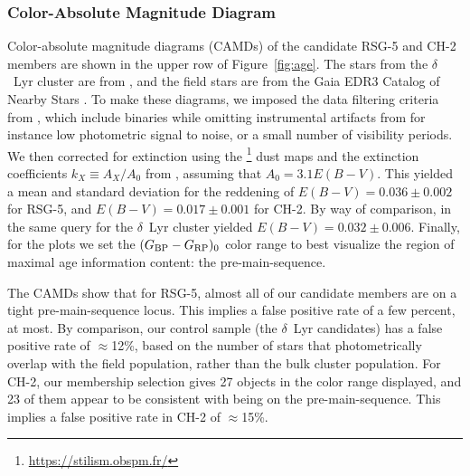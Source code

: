 \documentclass[12pt,twocolumn,linenumbers]{aastex63}
\newcommand{\bpmrpo}{(G_{\rm BP}-G_{\rm RP})_0}
\begin{document}
\subsubsection{Color-Absolute Magnitude Diagram}
\label{sec:camd}

Color-absolute magnitude diagrams (CAMDs) of the candidate RSG-5 and
CH-2 members are shown in the upper row of Figure~\ref{fig:age}.  The
stars from the $\delta$~Lyr cluster are from
\citet{bouma_kep1627_2022}, and the field stars are from the Gaia EDR3
Catalog of Nearby Stars \citep{gaia_gcns_2021}.  To make these
diagrams, we imposed the data filtering criteria from
\citet[][Appendix B]{GaiaCollaboration2018}, which 
include binaries while omitting instrumental artifacts from for
instance low photometric signal to noise, or a small number of
visibility periods.  We then corrected for extinction using the
\citet{lallement_threedimensional_2018}\footnote{\url{https://stilism.obspm.fr/}}
dust maps and the extinction coefficients $k_X\equiv A_X/A_0$ from
\citet{GaiaCollaboration2018}, assuming that $A_0 = 3.1 E(B-V)$.  This
yielded a mean and standard deviation for the reddening of
$E(B-V)=0.036\pm0.002$ for RSG-5, and $E(B-V)=0.017\pm0.001$
for CH-2.  By way of comparison, in \citet{bouma_kep1627_2022} the
same query for the $\delta$~Lyr cluster yielded
$E(B-V)=0.032\pm0.006$.  Finally, for the plots we set the $\bpmrpo$
color range to best visualize the region of maximal age information
content: the pre-main-sequence.

The CAMDs show that for RSG-5, almost all of our candidate members are
on a tight pre-main-sequence locus.  This implies a false positive
rate of a few percent, at most.  By comparison, our control sample
(the $\delta$~Lyr candidates) has a false positive rate of
$\approx$12\%, based on the number of stars that photometrically
overlap with the field population, rather than the bulk cluster
population.  For CH-2, our membership selection gives 27 objects in
the color range displayed, and 23 of them appear to be consistent with
being on the pre-main-sequence.  This implies a false positive rate in
CH-2 of $\approx$15\%.
\end{document}
